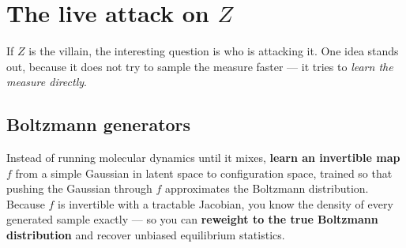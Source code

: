\clearpage
\renewcommand{\sectioncolor}{measure}
\section{The live attack on \texorpdfstring{$Z$}{Z}}

If $Z$ is the villain, the interesting question is who is attacking it. One idea stands out, because
it does not try to sample the measure faster --- it tries to \emph{learn the measure directly}.

\subsection{Boltzmann generators}

\begin{evidence}[title={Noé, Olsson, Köhler \& Wu, \textit{Science} \textbf{365}, eaaw1147 (2019)}]
Instead of running molecular dynamics until it mixes, \textbf{learn an invertible map} $f$ from a
simple Gaussian in latent space to configuration space, trained so that pushing the Gaussian through
$f$ approximates the Boltzmann distribution. Because $f$ is invertible with a tractable Jacobian, you
know the density of every generated sample exactly --- so you can \textbf{reweight to the true
Boltzmann distribution} and recover unbiased equilibrium statistics.
\end{evidence}


